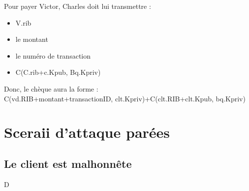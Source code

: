 \documentclass[oneside,10pt]{article}
\begin{document}
Pour payer Victor, Charles doit lui transmettre :
\begin{itemize}
\item V.rib
\item le montant
\item le num\'ero de transaction
\item C(C.rib+c.Kpub, Bq.Kpriv)
\end{itemize}
Donc, le ch\`eque aura la forme : \\C(vd.RIB+montant+transactionID, clt.Kpriv)+C(clt.RIB+clt.Kpub, bq.Kpriv)

\section{Sceraii d'attaque par\'ees}
\subsection{Le client est malhonn\^ete}
D
\end{document}

